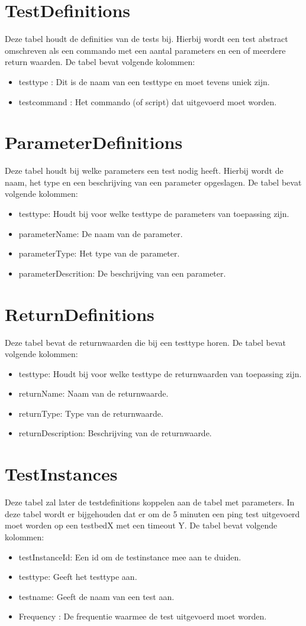 \section{TestDefinitions}
Deze tabel houdt de definities van de tests bij.
Hierbij wordt een test abstract omschreven als een commando met een aantal parameters en een of meerdere return waarden. De tabel bevat volgende kolommen:
\begin{itemize}
\item testtype : Dit is de naam van een testtype en moet tevens uniek zijn.
\item testcommand : Het commando (of script) dat uitgevoerd moet worden.
\end{itemize}
\section{ParameterDefinitions}
Deze tabel houdt bij welke parameters een test nodig heeft. Hierbij wordt de naam, het type en een beschrijving van een parameter opgeslagen. De tabel bevat volgende kolommen:
\begin{itemize}
\item testtype: Houdt bij voor welke testtype de parameters van toepassing zijn.
\item parameterName: De naam van de parameter.
\item parameterType: Het type van de parameter.
\item parameterDescrition: De beschrijving van een parameter.
\end{itemize}
\section{ReturnDefinitions}
Deze tabel bevat de returnwaarden die bij een testtype horen. De tabel bevat volgende kolommen:
\begin{itemize}
\item testtype: Houdt bij voor welke testtype de returnwaarden van toepassing zijn.
\item returnName: Naam van de returnwaarde.
\item returnType: Type van de returnwaarde.
\item returnDescription: Beschrijving van de returnwaarde.
\end{itemize}

\section{TestInstances}
Deze tabel zal later de testdefinitions koppelen aan de tabel met parameters. 
In deze tabel wordt er bijgehouden dat er om de 5 minuten een ping test uitgevoerd moet worden op een testbedX met een timeout Y.
De tabel bevat volgende kolommen: 
\begin{itemize}
\item testInstanceId: Een id om de testinstance mee aan te duiden.
\item testtype: Geeft het testtype aan.
\item testname: Geeft de naam van een test aan.
\item Frequency : De frequentie waarmee de test uitgevoerd moet worden.
\end{itemize}

